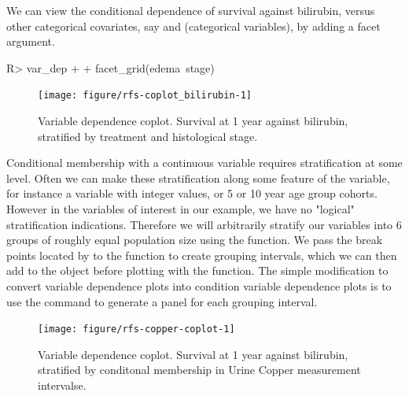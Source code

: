 \documentclass[nojss]{jss}\usepackage[]{graphicx}\usepackage[]{color}
\begin{document}
We can view the conditional dependence of survival against bilirubin, versus other categorical covariates, say  and  (categorical variables), by adding a facet argument.
\begin{Schunk}
\begin{Sinput}
R> var_dep + 
+   facet_grid(edema~stage)
\end{Sinput}
\begin{figure}[!htpb]

{\centering \texttt{[image: figure/rfs-coplot\_bilirubin-1]} 

}

\caption[Variable dependence coplot]{Variable dependence coplot. Survival at 1 year against bilirubin, stratified by treatment and histological stage.\label{fig:coplot_bilirubin}}
\end{figure}
\end{Schunk}

Conditional membership with a continuous variable requires stratification at some level. Often we can make these stratification along some feature of the variable, for instance a variable with integer values, or 5 or 10 year age group cohorts. However in the variables of interest in our example, we have no "logical" stratification indications. Therefore we will arbitrarily stratify our variables into 6 groups of roughly equal population size using the  function. We pass the break points located by  to the  function to create grouping intervals, which we can then add to the  object before plotting with the  function. The simple modification to convert variable dependence plots into condition variable dependence plots is to use the  command to generate a panel for each grouping interval.

\begin{Schunk}
\begin{figure}[!htpb]

{\centering \texttt{[image: figure/rfs-copper-coplot-1]} 

}

\caption[Variable dependence coplot]{Variable dependence coplot. Survival at 1 year against bilirubin, stratified by conditonal membership in Urine Copper measurement intervalse.\label{fig:copper-coplot}}
\end{figure}
\end{Schunk}
\end{document}
